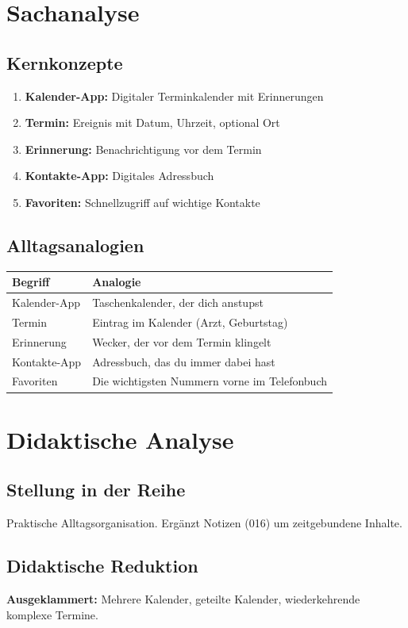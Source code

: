 \documentclass[11pt,a4paper]{article}
\begin{document}
\section{Sachanalyse}

\subsection{Kernkonzepte}
\begin{enumerate}
    \item \textbf{Kalender-App:} Digitaler Terminkalender mit Erinnerungen
    \item \textbf{Termin:} Ereignis mit Datum, Uhrzeit, optional Ort
    \item \textbf{Erinnerung:} Benachrichtigung vor dem Termin
    \item \textbf{Kontakte-App:} Digitales Adressbuch
    \item \textbf{Favoriten:} Schnellzugriff auf wichtige Kontakte
\end{enumerate}

\subsection{Alltagsanalogien}
\begin{tabular}{|l|p{8cm}|}
\hline
\textbf{Begriff} & \textbf{Analogie} \\
\hline
Kalender-App & Taschenkalender, der dich anstupst \\
Termin & Eintrag im Kalender (Arzt, Geburtstag) \\
Erinnerung & Wecker, der vor dem Termin klingelt \\
Kontakte-App & Adressbuch, das du immer dabei hast \\
Favoriten & Die wichtigsten Nummern vorne im Telefonbuch \\
\hline
\end{tabular}

\section{Didaktische Analyse}

\subsection{Stellung in der Reihe}
Praktische Alltagsorganisation. Ergänzt Notizen (016) um zeitgebundene Inhalte.

\subsection{Didaktische Reduktion}
\textbf{Ausgeklammert:} Mehrere Kalender, geteilte Kalender, wiederkehrende komplexe Termine.
\end{document}
